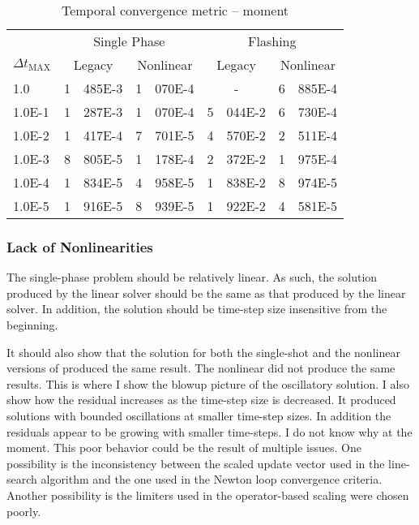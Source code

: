 \begin{table}[h!t]
\centering
\begin{tabular}{@{}l r@{.}l r@{.}l r@{.}l r@{.}l @{}}
\toprule
& \multicolumn{4}{c}{Single Phase} & \multicolumn{4}{c}{Flashing}  \\
$\Delta t_{\text{MAX}}$ & \multicolumn{2}{c}{Legacy} & \multicolumn{2}{c}{Nonlinear} & \multicolumn{2}{c}{Legacy}& \multicolumn{2}{c}{Nonlinear}  \\
\midrule
1.0    & 1&485E-3 & 1&070E-4 & \multicolumn{2}{c}{-} & 6&885E-4 \\
1.0E-1 & 1&287E-3 & 1&070E-4 & 5&044E-2 & 6&730E-4 \\
1.0E-2 & 1&417E-4 & 7&701E-5 & 4&570E-2 & 2&511E-4 \\
1.0E-3 & 8&805E-5 & 1&178E-4 & 2&372E-2 & 1&975E-4 \\
1.0E-4 & 1&834E-5 & 4&958E-5 & 1&838E-2 & 8&974E-5 \\
1.0E-5 & 1&916E-5 & 8&939E-5 & 1&922E-2 & 4&581E-5 \\
\bottomrule  
\end{tabular}
\caption{Temporal convergence metric -- moment}
\label{tab:criteria_moment}
\end{table}

\subsubsection{Lack of Nonlinearities}
\label{sect:result_linear_problem}


The single-phase problem should be relatively linear.
As such, the solution produced by the linear solver should be the same as that produced by the linear solver.
In addition, the solution should be time-step size insensitive from the beginning.


It should also show that the solution for both the single-shot and the nonlinear versions of \cobra{} produced the same result.
The nonlinear \cobra{} did not produce the same results.
This is where I show the blowup picture of the oscillatory solution.
I also show how the residual increases as the time-step size is decreased.
It produced solutions with bounded oscillations at smaller time-step sizes.
In addition the residuals appear to be growing with smaller time-steps.
I do not know why at the moment.
This poor behavior could be the result of multiple issues.
One possibility is the inconsistency between the scaled update vector used in the line-search algorithm and  the one used in the Newton loop convergence criteria.
Another possibility is the limiters used in the operator-based scaling were chosen poorly.

